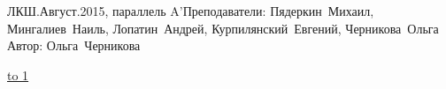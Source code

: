 ﻿


\BigHeader
	{ЛКШ.Август.2015, параллель A'}{Преподаватели: Пядеркин~Михаил,
	 Мингалиев~Наиль, Лопатин~Андрей, Курпилянский~Евгений, Черникова~Ольга}
	{Автор: Ольга~Черникова}

\vspace{-1em}
\noindent \underline{\hbox to 1\textwidth{{ } \hfil{ } \hfil{ } }}

\vspace{1em}
\tableofcontents
\pagebreak















